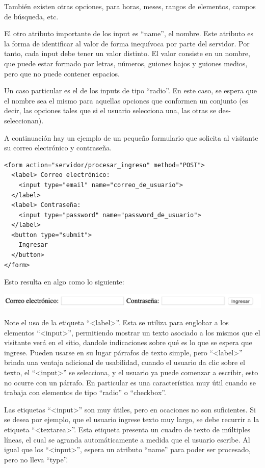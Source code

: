 También existen otras opciones, para horas, meses, rangos de elementos, campos
de búsqueda, etc.

El otro atributo importante de los input es ``name'', el nombre. Este atributo
es la forma de identificar al valor de forma inequívoca por parte del servidor.
Por tanto, cada input debe tener un valor distinto. El valor consiste en un
nombre, que puede estar formado por letras, números, guiones bajos y guiones
medios, pero que no puede contener espacios.

Un caso particular es el de los inputs de tipo ``radio''. En este caso, se espera
que el nombre sea el mismo para aquellas opciones que conformen un conjunto (es
decir, las opciones tales que si el usuario selecciona una, las otras se
des-seleccionan).

A continuación hay un ejemplo de un pequeño formulario que solicita al visitante
su correo electrónico y contraseña.

\begin{lstlisting}[language=XHTML]
<form action="servidor/procesar_ingreso" method="POST">
  <label> Correo electrónico:
    <input type="email" name="correo_de_usuario">
  </label>
  <label> Contraseña:
    <input type="password" name="password_de_usuario">
  </label>
  <button type="submit">
    Ingresar
  </button>
</form>
\end{lstlisting}

Esto resulta en algo como lo siguiente:

\includegraphics[scale=0.7]{anexos/1_lenguajes_marcado/2_html/imagenes/form_sample_login.png}

Note el uso de la etiqueta ``<label>''. Esta se utiliza para englobar a los
elementos ``<input>'', permitiendo mostrar un texto asociado a los mismos
que el visitante verá en el sitio, dandole indicaciones sobre qué es lo que
se espera que ingrese. Pueden usarse en su lugar párrafos de texto simple,
pero ``<label>'' brinda una ventaja adicional de usabilidad, cuando el
usuario da clic sobre el texto, el ``<input>'' se selecciona, y el usuario
ya puede comenzar a escribir, esto no ocurre con un párrafo. En particular
es una característica muy útil cuando se trabaja con elementos de tipo
``radio'' o ``checkbox''.

Las etiquetas ``<input>'' son muy útiles, pero en ocaciones no son suficientes.
Si se desea por ejemplo, que el usuario ingrese texto muy largo, se debe recurrir
a la etiqueta ``<textarea>''. Esta etiqueta presenta un cuadro de texto de
múltiples líneas, el cual se agranda automáticamente a medida que el usuario
escribe. Al igual que los ``<input>'', espera un atributo ``name'' para poder
ser procesado, pero no lleva ``type''.

